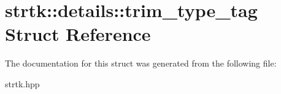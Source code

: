 \hypertarget{structstrtk_1_1details_1_1trim__type__tag}{\section{strtk\-:\-:details\-:\-:trim\-\_\-type\-\_\-tag Struct Reference}
\label{structstrtk_1_1details_1_1trim__type__tag}
}


The documentation for this struct was generated from the following file\-:\begin{DoxyCompactItemize}
\item 
strtk.\-hpp\end{DoxyCompactItemize}
